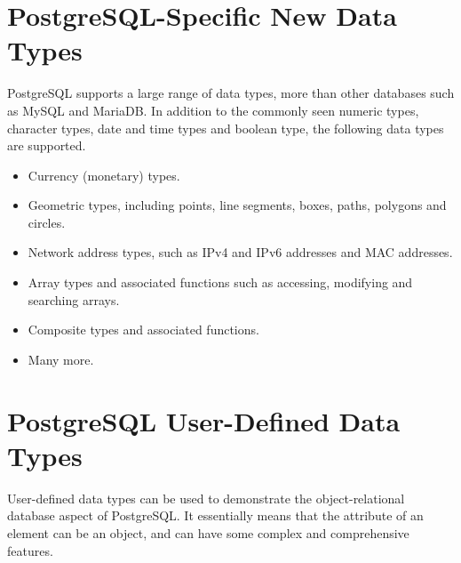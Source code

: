\section{PostgreSQL-Specific New Data Types}

PostgreSQL supports a large range of data types, more than other databases such as MySQL and MariaDB. In addition to the commonly seen numeric types, character types, date and time types and boolean type, the following data types are supported.
\begin{itemize}
	\item Currency (monetary) types.
	\item Geometric types, including points, line segments, boxes, paths, polygons and circles.
	\item Network address types, such as IPv4 and IPv6 addresses and MAC addresses.
	\item Array types and associated functions such as accessing, modifying and searching arrays.
	\item Composite types and associated functions.
	\item Many more.
\end{itemize}

\section{PostgreSQL User-Defined Data Types}

User-defined data types can be used to demonstrate the object-relational database aspect of PostgreSQL. It essentially means that the attribute of an element can be an object, and can have some complex and comprehensive features.

